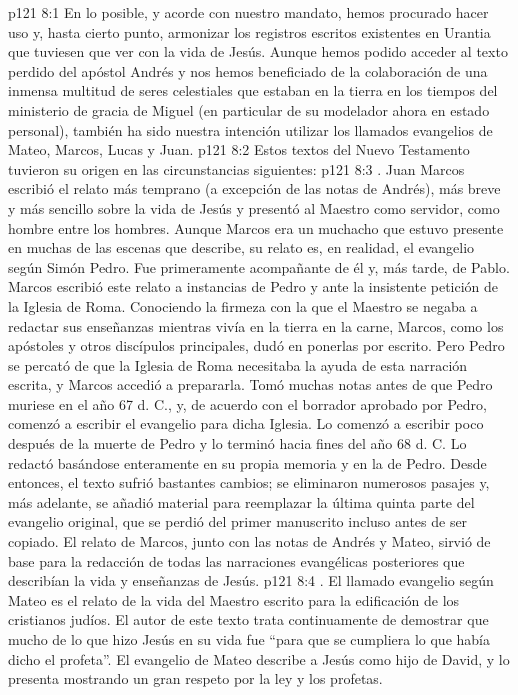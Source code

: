 \vs p121 8:1 En lo posible, y acorde con nuestro mandato, hemos procurado hacer uso y, hasta cierto punto, armonizar los registros escritos existentes en Urantia que tuviesen que ver con la vida de Jesús. Aunque hemos podido acceder al texto perdido del apóstol Andrés y nos hemos beneficiado de la colaboración de una inmensa multitud de seres celestiales que estaban en la tierra en los tiempos del ministerio de gracia de Miguel (en particular de su modelador ahora en estado personal), también ha sido nuestra intención utilizar los llamados evangelios de Mateo, Marcos, Lucas y Juan.
\vs p121 8:2 Estos textos del Nuevo Testamento tuvieron su origen en las circunstancias siguientes:
\vs p121 8:3 . Juan Marcos escribió el relato más temprano (a excepción de las notas de Andrés), más breve y más sencillo sobre la vida de Jesús y presentó al Maestro como servidor, como hombre entre los hombres. Aunque Marcos era un muchacho que estuvo presente en muchas de las escenas que describe, su relato es, en realidad, el evangelio según Simón Pedro. Fue primeramente acompañante de él y, más tarde, de Pablo. Marcos escribió este relato a instancias de Pedro y ante la insistente petición de la Iglesia de Roma. Conociendo la firmeza con la que el Maestro se negaba a redactar sus enseñanzas mientras vivía en la tierra en la carne, Marcos, como los apóstoles y otros discípulos principales, dudó en ponerlas por escrito. Pero Pedro se percató de que la Iglesia de Roma necesitaba la ayuda de esta narración escrita, y Marcos accedió a prepararla. Tomó muchas notas antes de que Pedro muriese en el año 67 d. C., y, de acuerdo con el borrador aprobado por Pedro, comenzó a escribir el evangelio para dicha Iglesia. Lo comenzó a escribir poco después de la muerte de Pedro y lo terminó hacia fines del año 68 d. C. Lo redactó basándose enteramente en su propia memoria y en la de Pedro. Desde entonces, el texto sufrió bastantes cambios; se eliminaron numerosos pasajes y, más adelante, se añadió material para reemplazar la última quinta parte del evangelio original, que se perdió del primer manuscrito incluso antes de ser copiado. El relato de Marcos, junto con las notas de Andrés y Mateo, sirvió de base para la redacción de todas las narraciones evangélicas posteriores que describían la vida y enseñanzas de Jesús.
\vs p121 8:4 . El llamado evangelio según Mateo es el relato de la vida del Maestro escrito para la edificación de los cristianos judíos. El autor de este texto trata continuamente de demostrar que mucho de lo que hizo Jesús en su vida fue “para que se cumpliera lo que había dicho el profeta”. El evangelio de Mateo describe a Jesús como hijo de David, y lo presenta mostrando un gran respeto por la ley y los profetas.
